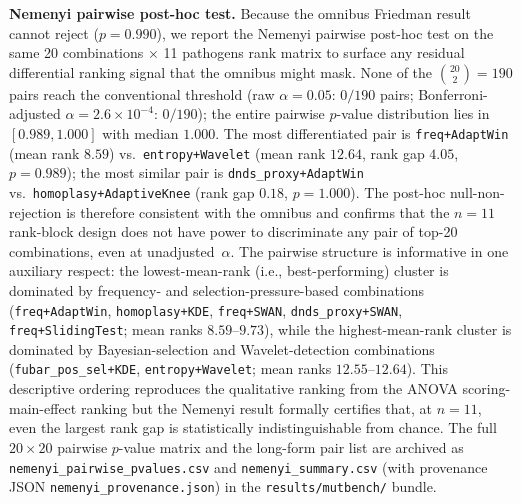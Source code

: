 \textbf{Nemenyi pairwise post-hoc test.} Because the omnibus Friedman result cannot reject ($p = 0.990$), we report the Nemenyi pairwise post-hoc test on the same 20 combinations $\times$ 11 pathogens rank matrix to surface any residual differential ranking signal that the omnibus might mask. None of the $\binom{20}{2} = 190$ pairs reach the conventional threshold (raw $\alpha = 0.05$: $0/190$ pairs; Bonferroni-adjusted $\alpha = 2.6 \times 10^{-4}$: $0/190$); the entire pairwise $p$-value distribution lies in $[0.989, 1.000]$ with median $1.000$. The most differentiated pair is \texttt{freq+AdaptWin} (mean rank $8.59$) vs.\ \texttt{entropy+Wavelet} (mean rank $12.64$, rank gap $4.05$, $p = 0.989$); the most similar pair is \texttt{dnds\_proxy+AdaptWin} vs.\ \texttt{homoplasy+AdaptiveKnee} (rank gap $0.18$, $p = 1.000$). The post-hoc null-non-rejection is therefore consistent with the omnibus and confirms that the $n = 11$ rank-block design does not have power to discriminate any pair of top-20 combinations, even at unadjusted~$\alpha$. The pairwise structure is informative in one auxiliary respect: the lowest-mean-rank (i.e., best-performing) cluster is dominated by frequency- and selection-pressure-based combinations (\texttt{freq+AdaptWin}, \texttt{homoplasy+KDE}, \texttt{freq+SWAN}, \texttt{dnds\_proxy+SWAN}, \texttt{freq+SlidingTest}; mean ranks $8.59$--$9.73$), while the highest-mean-rank cluster is dominated by Bayesian-selection and Wavelet-detection combinations (\texttt{fubar\_pos\_sel+KDE}, \texttt{entropy+Wavelet}; mean ranks $12.55$--$12.64$). This descriptive ordering reproduces the qualitative ranking from the ANOVA scoring-main-effect ranking but the Nemenyi result formally certifies that, at $n = 11$, even the largest rank gap is statistically indistinguishable from chance. The full $20 \times 20$ pairwise $p$-value matrix and the long-form pair list are archived as \texttt{nemenyi\_pairwise\_pvalues.csv} and \texttt{nemenyi\_summary.csv} (with provenance JSON \texttt{nemenyi\_provenance.json}) in the \texttt{results/mutbench/} bundle.


